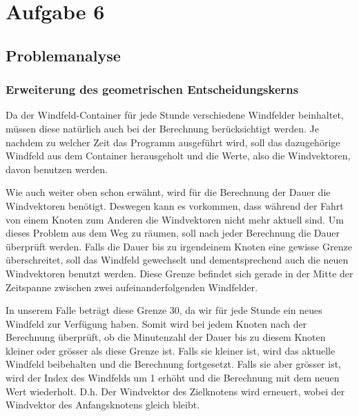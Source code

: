 
\section{Aufgabe 6}

\subsection{Problemanalyse}
\subsubsection{Erweiterung des geometrischen Entscheidungskerns}
Da der Windfeld-Container für jede Stunde verschiedene Windfelder beinhaltet, müssen diese natürlich auch bei der Berechnung berücksichtigt werden. Je nachdem zu welcher Zeit das Programm ausgeführt wird, soll das dazugehörige Windfeld aus dem Container herausgeholt und die Werte, also die Windvektoren, davon benutzen werden. 

Wie auch weiter oben schon erwähnt, wird für die Berechnung der Dauer die Windvektoren benötigt. Deswegen kann es vorkommen, dass während der Fahrt von einem Knoten zum Anderen die Windvektoren nicht mehr aktuell sind. Um dieses Problem aus dem Weg zu räumen, soll nach jeder Berechnung die Dauer überprüft werden. Falls die Dauer bis zu irgendeinem Knoten eine gewisse Grenze überschreitet, soll das Windfeld gewechselt und dementsprechend  auch die neuen Windvektoren benutzt werden. Diese Grenze befindet sich gerade in der Mitte der Zeitspanne zwischen zwei aufeinanderfolgenden Windfelder. 

In unserem Falle beträgt diese Grenze 30, da wir für jede Stunde ein neues Windfeld zur Verfügung haben. Somit wird bei jedem Knoten nach der Berechnung überprüft, ob die Minutenzahl der Dauer bis zu diesem Knoten kleiner oder grösser als diese Grenze ist. Falls sie kleiner ist, wird das aktuelle Windfeld beibehalten und die Berechnung fortgesetzt. Falls sie aber grösser ist, wird der Index des Windfelds um 1 erhöht und die Berechnung mit dem neuen Wert wiederholt. D.h. Der Windvektor des Zielknotens wird erneuert, wobei der Windvektor des Anfangsknotens gleich bleibt.

